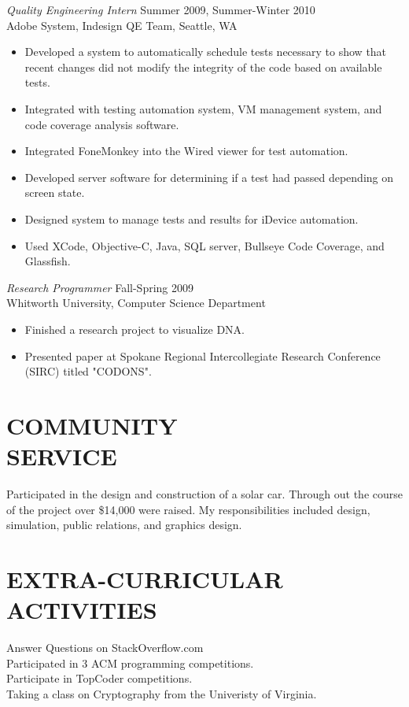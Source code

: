 \documentclass[line,margin]{res}
\begin{document}
\begin{resume}
				{\sl Quality Engineering Intern} \hfill Summer 2009, Summer-Winter 2010 \\
                Adobe System, Indesign QE Team, Seattle, WA
                 \begin{itemize}  \itemsep -2pt %
	                 \item Developed a system to automatically schedule tests necessary to show that recent changes did not modify the integrity of the code based on available tests.
	                \item Integrated with testing automation system, VM management system, and code coverage analysis software.
	                 \item Integrated FoneMonkey into the Wired viewer for test automation.
	                 \item Developed server software for determining if a test had passed depending on screen state.
	                 \item Designed system to manage tests and results for iDevice automation.
	                 \item Used XCode, Objective-C, Java, SQL server, Bullseye Code Coverage, and Glassfish.
 				 \end{itemize}
 								 
                {\sl Research Programmer} \hfill             Fall-Spring 2009 \\
                Whitworth University, Computer Science Department
                 \begin{itemize}  \itemsep -2pt %
	                 \item Finished a research project to visualize DNA.
	                 \item Presented paper at Spokane Regional Intercollegiate Research Conference (SIRC) titled "CODONS".
                 \end{itemize} 				
                 
                 


					
\section{COMMUNITY \\ SERVICE} Participated in the design and construction of a solar car. Through out the course of the project over \$14,000 were raised. My responsibilities included design, simulation, public relations, and graphics design.

\section{EXTRA-CURRICULAR \\ ACTIVITIES}
	Answer Questions on StackOverflow.com\\
	Participated in 3 ACM programming competitions.\\
	Participate in TopCoder competitions.\\
	Taking a class on Cryptography from the Univeristy of Virginia.
\end{resume}
\end{document}
